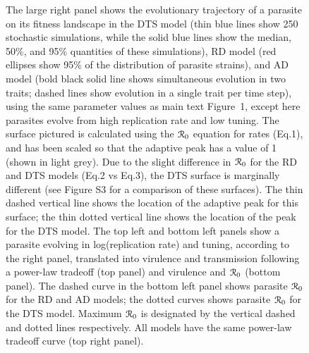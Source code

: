 \documentclass{article}
\newcommand{\rzero}{{\cal R}_0\xspace}
\begin{document}
\begin{figure}[H]
\caption{The large right panel shows the evolutionary trajectory of a parasite on its fitness landscape in the DTS model (thin blue lines show 250 stochastic simulations, while the solid blue lines show the median, 50\%, and 95\% quantities of these simulations), RD model (red ellipses show 95\% of the distribution of parasite strains), and AD model (bold black solid line shows simultaneous evolution in two traits; dashed lines show evolution in a single trait per time step), using the same parameter values as main text Figure~1, except here parasites evolve from high replication rate and low tuning. The surface pictured is calculated using the $\rzero$ equation for rates (Eq.1), and has been scaled so that the adaptive peak has a value of 1 (shown in light grey). Due to the slight difference in $\rzero$ for the RD and DTS models (Eq.2 vs Eq.3), the DTS surface is marginally different (see Figure S3 for a comparison of these surfaces). The thin dashed vertical line shows the location of the adaptive peak for this surface; the thin dotted vertical line shows the location of the peak for the DTS model. 
\break
The top left and bottom left panels show a parasite evolving in log(replication rate) and tuning, according to the right panel, translated into virulence and transmission following a power-law tradeoff (top panel) and virulence and $\rzero$ (bottom panel). The dashed curve in the bottom left panel shows parasite $\rzero$ for the RD and AD models; the dotted curves shows parasite $\rzero$ for the DTS model. Maximum $\rzero$ is designated by the vertical dashed and dotted lines respectively. All models have the same power-law tradeoff curve (top right panel).} 
\label{fig:landscape1_br}
\end{figure} 
\clearpage
\end{document}
